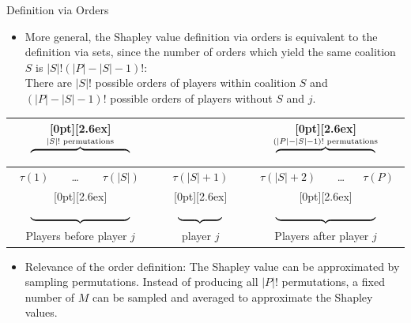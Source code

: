 \documentclass[aspectratio=169]{../latex_main/tntbeamer}  %
\begin{document}
\begin{frame}{Definition via Orders}
  
\begin{itemize}
  \item More general, the Shapley value definition via orders is equivalent to the definition via sets, since the number of orders which yield the same coalition $S$ is  $|S|!(|P| - |S| - 1)!$:\\ There are $|S|!$ possible orders of players within coalition $S$ and $(|P| - |S| - 1)!$ possible orders of players without $S$ and $j$.
\end{itemize}

\centering
  \begin{tabular}{|c|c|c|c|c|c|c|}
    \multicolumn{3}{c}{\enspace\raisebox{-3.3ex}[0pt][2.6ex]{$ \overbrace{\vphantom{-}\hspace{9em}}^{|S|! \text{ permutations}}$}} &
    \multicolumn{1}{c}{} & 
    \multicolumn{3}{c}{\enspace\raisebox{-3.3ex}[0pt][2.6ex]{$ \overbrace{\vphantom{-}\hspace{9em}}^{(|P| - |S| - 1)! \text{ permutations}}$}}\\
    \hline
    $\tau(1)$ & \ldots & $\tau(|S|)$ & $\tau(|S| + 1)$ & $\tau(|S| + 2)$ & \ldots & $\tau(P)$ \\
    \hline
    \multicolumn{3}{c}{\enspace\raisebox{1.3ex}[0pt][2.6ex]{$ \underbrace{\vphantom{-}\hspace{9em}}^{}$}} &
    \multicolumn{1}{c}{\enspace\raisebox{1.3ex}[0pt][2.6ex]{$ \underbrace{\vphantom{-}\hspace{4em}}^{}$}} & 
    \multicolumn{3}{c}{\enspace\raisebox{1.3ex}[0pt][2.6ex]{$ \underbrace{\vphantom{-}\hspace{9em}}^{}$}}\\
    \multicolumn{3}{c}{Players before player $j$} & \multicolumn{1}{c}{player $j$} & \multicolumn{3}{c}{Players after player $j$} \\
  \end{tabular}

\begin{itemize}
  \item Relevance of the order definition: The Shapley value can be approximated by sampling permutations. Instead of producing all $|P|!$ permutations, a fixed number of $M$ can be sampled and averaged to approximate the Shapley values.
\end{itemize}

\end{frame}
\end{document}
